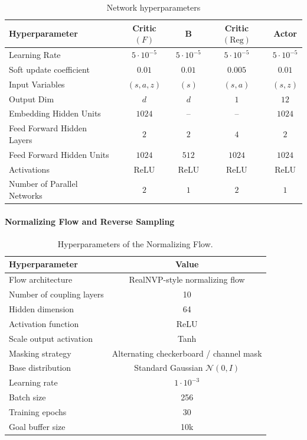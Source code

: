 \label{appendix:fb_hparams}
\begin{table}[H]
\centering
\small
\setlength{\tabcolsep}{10pt}
\renewcommand{\arraystretch}{1.15}
\begin{tabular}{lcccc}
\toprule
\textbf{Hyperparameter} &
\textbf{Critic $(F)$} &
\textbf{B} &
\textbf{Critic $(\text{Reg})$} &
\textbf{Actor} \\
\midrule
Learning Rate &
$5\cdot 10^{-5}$ &
$5\cdot 10^{-5}$ &
$5\cdot 10^{-5}$ &
$5\cdot 10^{-5}$ \\

Soft update coefficient& 
$0.01$& 
$0.01$& 
$0.005$&
$0.01$\\

Input Variables &
$(s, a, z)$ &
$(s)$ &
$(s, a)$&
$(s, z)$ \\

Output Dim &
$d$ &
$d$ &
$1$ &
$12$ \\

Embedding Hidden Units &
$1024$ &
-- &
--&
$1024$ \\

Feed Forward Hidden Layers &
$2$ &
$2$ &
$4$&
$2$ \\

Feed Forward Hidden Units &
$1024$ &
$512$ &
$1024$ &
$1024$ \\

Activations &
ReLU &
ReLU &
ReLU &
ReLU \\

Number of Parallel Networks &
$2$ &
$1$ &
$2$ &
$1$ \\
\bottomrule
\end{tabular}
\caption{Network hyperparameters}
\label{tab:fb_hparams}
\end{table}

\paragraph{Normalizing Flow and Reverse Sampling}

\begin{table}[H]
\centering
\caption{Hyperparameters of the Normalizing Flow.}
\begin{tabular}{l c}
\toprule
\textbf{Hyperparameter} & \textbf{Value} \\
\midrule
Flow architecture & RealNVP-style normalizing flow \\
Number of coupling layers & 10 \\
Hidden dimension & 64 \\
Activation function & ReLU \\
Scale output activation & Tanh \\
Masking strategy & Alternating checkerboard / channel mask \\
Base distribution & Standard Gaussian $\mathcal{N}(0, I)$ \\
Learning rate & $1\cdot 10^{-3}$ \\
Batch size & 256 \\
Training epochs & 30 \\
Goal buffer size & 10k \\
\bottomrule
\end{tabular}
\label{tab:nf_hyperparameters}
\end{table}

